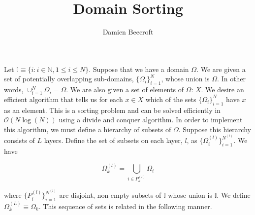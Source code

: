 \documentclass{article}
\title{Domain Sorting}
\author{Damien Beecroft}
\begin{document}
\maketitle
	Let $\mathbb{I} \equiv \{i: i \in \mathbb{N}, 1 \leq i \leq N \}$. Suppose that we have a domain $\Omega$. We are given a set of potentially overlapping sub-domains, $\{\Omega_i\}_{i=1}^N$, whose union is $\Omega$. In other words, $\cup_{i=1}^N \Omega_i = \Omega$. We are also given a set of elements of $\Omega$: $X$. We desire an efficient algorithm that tells us for each $x \in X$ which of the sets $\{\Omega_i\}_{i=1}^N$ have $x$ as an element. This is a sorting problem and can be solved efficiently in $\mathcal{O}(N \log(N))$ using a divide and conquer algorithm. In order to implement this algorithm, we must define a hierarchy of subsets of $\Omega$. Suppose this hierarchy consists of $L$ layers. Define the set of subsets on each layer, $l$, as $\{\Omega^{(l)}_i\}_{i=1}^{N^{(l)}}$. We have
	
\[
\Omega_k^{(l)} = \bigcup_{i \in P^{(l)}_k} \Omega_i
\]

\noindent where $\{P^{(l)}_i\}_{i=1}^{N^{(l)}}$ are disjoint, non-empty subsets of $\mathbb{I}$ whose union is $\mathbb{I}$. We define $\Omega^{(L)}_k \equiv \Omega_k$. This sequence of sets is related in the following manner. 

%	
	
\end{document}
